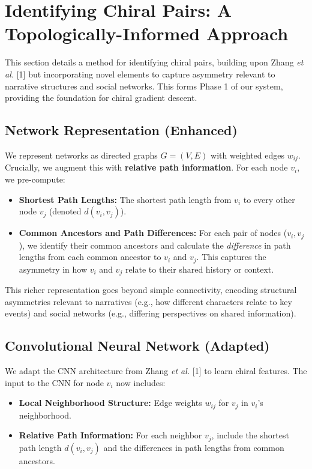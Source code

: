 \documentclass[12pt, a4paper]{article}
\begin{document}
\section{Identifying Chiral Pairs: A Topologically-Informed Approach}

This section details a method for identifying chiral pairs, building upon Zhang \textit{et al.} [1] but incorporating novel elements to capture asymmetry relevant to narrative structures and social networks. This forms Phase 1 of our system, providing the foundation for chiral gradient descent.

\subsection{Network Representation (Enhanced)}

We represent networks as directed graphs $G = (V, E)$ with weighted edges $w_{ij}$. Crucially, we augment this with \textbf{relative path information}. For each node $v_i$, we pre-compute:

\begin{itemize}
    \item \textbf{Shortest Path Lengths:} The shortest path length from $v_i$ to every other node $v_j$ (denoted $d(v_i, v_j)$).
    \item \textbf{Common Ancestors and Path Differences:} For each pair of nodes ($v_i, v_j$), we identify their common ancestors and calculate the \textit{difference} in path lengths from each common ancestor to $v_i$ and $v_j$. This captures the asymmetry in how $v_i$ and $v_j$ relate to their shared history or context.
\end{itemize}

This richer representation goes beyond simple connectivity, encoding structural asymmetries relevant to narratives (e.g., how different characters relate to key events) and social networks (e.g., differing perspectives on shared information).

\subsection{Convolutional Neural Network (Adapted)}

We adapt the CNN architecture from Zhang \textit{et al.} [1] to learn chiral features. The input to the CNN for node $v_i$ now includes:

\begin{itemize}
    \item \textbf{Local Neighborhood Structure:} Edge weights $w_{ij}$ for $v_j$ in $v_i$'s neighborhood.
    \item \textbf{Relative Path Information:} For each neighbor $v_j$, include the shortest path length $d(v_i, v_j)$ and the differences in path lengths from common ancestors.
\end{itemize}
\end{document}
